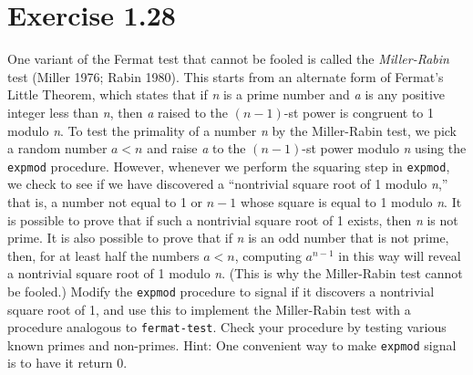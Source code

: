 \documentclass[11pt]{article}
\begin{document}
\section{Exercise 1.28}
\label{sec:orgd6493fc}
One variant of the Fermat test that cannot be fooled is called the
\emph{Miller-Rabin} test (Miller 1976; Rabin 1980). This starts from an alternate
form of Fermat’s Little Theorem, which states that if \emph{n} is a prime number
and \emph{a} is any positive integer less than \emph{n}, then \emph{a} raised to the \((n-1)\)-st power is congruent to 1 modulo \emph{n}. To test the primality of a number
\emph{n} by the Miller-Rabin test, we pick a random number \(a<n\) and raise \emph{a}
to the \((n-1)\)-st power modulo \emph{n} using the \texttt{expmod} procedure. However,
whenever we perform the squaring step in \texttt{expmod}, we check to see if we have
discovered a ``nontrivial square root of 1 modulo \emph{n},'' that is, a number not
equal to 1 or \(n-1\) whose square is equal to 1 modulo \emph{n}. It is possible
to prove that if such a nontrivial square root of 1 exists, then \emph{n} is not
prime. It is also possible to prove that if \emph{n} is an odd number that is not
prime, then, for at least half the numbers \(a<n\), computing \(a^{n-1}\)
in this way will reveal a nontrivial square root of 1 modulo \emph{n}. (This is why
the Miller-Rabin test cannot be fooled.)  Modify the \texttt{expmod} procedure to
signal if it discovers a nontrivial square root of 1, and use this to
implement the Miller-Rabin test with a procedure analogous to
\texttt{fermat-test}. Check your procedure by testing various known primes and
non-primes. Hint: One convenient way to make \texttt{expmod} signal is to have it
return 0.
\end{document}
